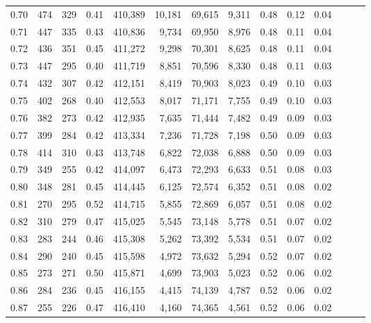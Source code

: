 \begin{tabular}{rrrrrrrrrrrrrr}
0.70 &     474 &    329 &  0.41 &  410,389 &   10,181 &  69,615 &   9,311 &  0.48 &  0.12 &      0.04 \\
0.71 &     447 &    335 &  0.43 &  410,836 &    9,734 &  69,950 &   8,976 &  0.48 &  0.11 &      0.04 \\
0.72 &     436 &    351 &  0.45 &  411,272 &    9,298 &  70,301 &   8,625 &  0.48 &  0.11 &      0.04 \\
0.73 &     447 &    295 &  0.40 &  411,719 &    8,851 &  70,596 &   8,330 &  0.48 &  0.11 &      0.03 \\
0.74 &     432 &    307 &  0.42 &  412,151 &    8,419 &  70,903 &   8,023 &  0.49 &  0.10 &      0.03 \\
0.75 &     402 &    268 &  0.40 &  412,553 &    8,017 &  71,171 &   7,755 &  0.49 &  0.10 &      0.03 \\
0.76 &     382 &    273 &  0.42 &  412,935 &    7,635 &  71,444 &   7,482 &  0.49 &  0.09 &      0.03 \\
0.77 &     399 &    284 &  0.42 &  413,334 &    7,236 &  71,728 &   7,198 &  0.50 &  0.09 &      0.03 \\
0.78 &     414 &    310 &  0.43 &  413,748 &    6,822 &  72,038 &   6,888 &  0.50 &  0.09 &      0.03 \\
0.79 &     349 &    255 &  0.42 &  414,097 &    6,473 &  72,293 &   6,633 &  0.51 &  0.08 &      0.03 \\
0.80 &     348 &    281 &  0.45 &  414,445 &    6,125 &  72,574 &   6,352 &  0.51 &  0.08 &      0.02 \\
0.81 &     270 &    295 &  0.52 &  414,715 &    5,855 &  72,869 &   6,057 &  0.51 &  0.08 &      0.02 \\
0.82 &     310 &    279 &  0.47 &  415,025 &    5,545 &  73,148 &   5,778 &  0.51 &  0.07 &      0.02 \\
0.83 &     283 &    244 &  0.46 &  415,308 &    5,262 &  73,392 &   5,534 &  0.51 &  0.07 &      0.02 \\
0.84 &     290 &    240 &  0.45 &  415,598 &    4,972 &  73,632 &   5,294 &  0.52 &  0.07 &      0.02 \\
0.85 &     273 &    271 &  0.50 &  415,871 &    4,699 &  73,903 &   5,023 &  0.52 &  0.06 &      0.02 \\
0.86 &     284 &    236 &  0.45 &  416,155 &    4,415 &  74,139 &   4,787 &  0.52 &  0.06 &      0.02 \\
0.87 &     255 &    226 &  0.47 &  416,410 &    4,160 &  74,365 &   4,561 &  0.52 &  0.06 &      0.02 \\

\end{tabular}
